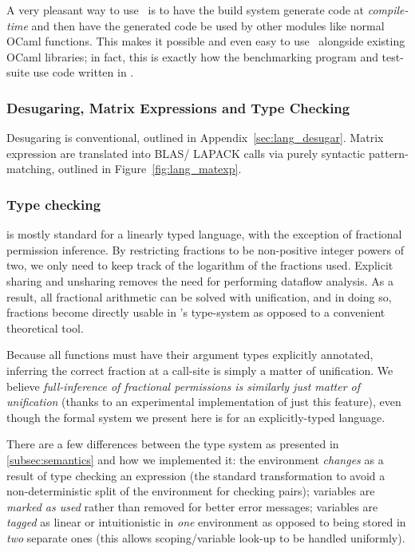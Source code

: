 A very pleasant way to use \lang\ is to have the build system generate code at
\emph{compile-time} and then have the generated code be used by other modules
like normal OCaml functions. This makes it possible and even easy to use \lang\
alongside existing OCaml libraries; in fact, this is exactly how the
benchmarking program and test-suite use code written in \lang.

\subsubsection{Desugaring, Matrix Expressions and Type Checking}\label{subsubsec:initial}

Desugaring is conventional, outlined in Appendix~\ref{sec:lang_desugar}.  Matrix
expression are translated into BLAS/ LAPACK calls via purely syntactic
pattern-matching, outlined in Figure~\ref{fig:lang_matexp}.

\subsubsection{Type checking} is mostly standard for a linearly typed language,
with the exception of fractional permission inference. By restricting fractions
to be non-positive integer powers of two, we only need to keep track of the
logarithm of the fractions used. Explicit sharing and unsharing removes the
need for performing dataflow analysis. As a result, all fractional arithmetic
can be solved with unification, and in doing so, fractions become directly
usable in \lang's type-system as opposed to a convenient theoretical tool.

Because all functions must have their argument types explicitly annotated,
inferring the correct fraction at a call-site is simply a matter of
unification. We believe \emph{full-inference of fractional permissions is
similarly just matter of unification} (thanks to an experimental implementation
of just this feature), even though the formal system we present here is for an
explicitly-typed language.

There are a few differences between the type system as presented in
\ref{subsec:semantics} and how we implemented it: the environment
\emph{changes} as a result of type checking an expression (the standard
transformation to avoid a non-deterministic split of the environment for
checking pairs); variables are \emph{marked as used} rather than removed for
better error messages; variables are \emph{tagged} as linear or intuitionistic
in \emph{one} environment as opposed to being stored in \emph{two} separate
ones (this allows scoping/variable look-up to be handled uniformly).

